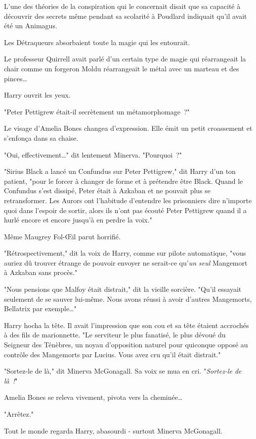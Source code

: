 L'une des théories de la conspiration qui le concernait disait que sa capacité à découvrir des secrets même pendant sa scolarité à Poudlard indiquait qu'il avait été un Animagus.

Les Détraqueurs absorbaient toute la magie qui les entourait.

Le professeur Quirrell avait parlé d'un certain type de magie qui réarrangeait la chair comme un forgeron Moldu réarrangeait le métal avec un marteau et des pinces…

Harry ouvrit les yeux.

"Peter Pettigrew était-il secrètement un métamorphomage~?"

Le visage d'Amelia Bones changea d'expression. Elle émit un petit croassement et s'enfonça dans sa chaise.

"Oui, effectivement…" dit lentement Minerva. "Pourquoi~?"

"Sirius Black a lancé un Confundus sur Peter Pettigrew," dit Harry d'un ton patient, "pour le forcer à changer de forme et à prétendre être Black. Quand le Confundus s'est dissipé, Peter était à Azkaban et ne pouvait plus se retransformer. Les Aurors ont l'habitude d'entendre les prisonniers dire n'importe quoi dans l'espoir de sortir, alors ils n'ont pas écouté Peter Pettigrew quand il a hurlé encore et encore jusqu'à en perdre la voix."

Même Maugrey Fol-Œil parut horrifié.

"Rétrospectivement," dit la voix de Harry, comme sur pilote automatique, "vous auriez dû trouver étrange de pouvoir envoyer ne serait-ce qu'\emph{un seul} Mangemort à Azkaban sans procès."

"Nous pensions que Malfoy était distrait," dit la vieille sorcière. "Qu'il essayait seulement de se sauver lui-même. Nous avons réussi à avoir d'autres Mangemorts, Bellatrix par exemple…"

Harry hocha la tête. Il avait l'impression que son cou et sa tête étaient accrochés à des fils de marionnette. "Le serviteur le plus fanatisé, le plus dévoué du Seigneur des Ténèbres, un noyau d'opposition naturel pour quiconque opposé au contrôle des Mangemorts par Lucius. Vous avez cru qu'il était distrait."

"Sortez-le de là," dit Minerva McGonagall. Sa voix se mua en cri. "\emph{Sortez-le de là~!}"

Amelia Bones se releva vivement, pivota vers la cheminée…

"Arrêtez."

Tout le monde regarda Harry, abasourdi - surtout Minerva McGonagall.

